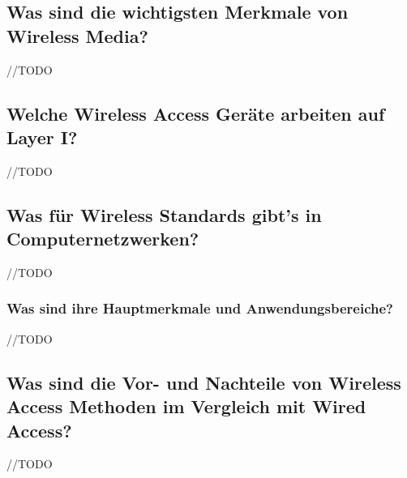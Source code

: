 \subsection*{Was sind die wichtigsten Merkmale von \flqq{}Wireless Media\frqq?}
//TODO
\subsection*{Welche Wireless Access Geräte arbeiten auf Layer I?}
//TODO
\subsection*{Was für Wireless Standards gibt’s in Computernetzwerken?}
//TODO
\subsubsection*{Was sind ihre Hauptmerkmale und Anwendungsbereiche?}
//TODO
\subsection*{Was sind die Vor- und Nachteile von \flqq{}Wireless Access\frqq{} Methoden im Vergleich mit \flqq{}Wired Access\frqq?}
//TODO